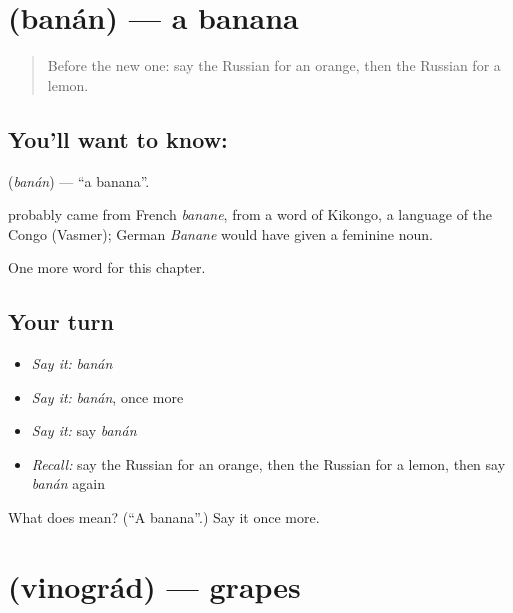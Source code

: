 \section[\texorpdfstring{\ru{банан} (banán)}{банан (banán)}]{ (banán) — a banana}

\label{lesson:RU-C223-banan}



\begin{quote}
Before the new one: say the Russian for an orange, then the Russian for a lemon.
\end{quote}

\subsection*{You'll want to know: }
\textbf{} (\emph{banán}) — \textquotedblleft{}a banana\textquotedblright{}.

\begin{cousinweb}
\textbf{} probably came from French \emph{banane}, from a word of Kikongo, a language of the Congo (Vasmer); German \emph{Banane} would have given a feminine noun.
\end{cousinweb}

\begin{grammarlens}[title={What you've built}]
One more word for this chapter.
\end{grammarlens}

\subsection*{Your turn}
\begin{itemize}
\raggedright
  \item \emph{Say it:} \emph{banán}
  \item \emph{Say it:} \emph{banán}, once more
  \item \emph{Say it:} say \emph{banán}
  \item \emph{Recall:} say the Russian for an orange, then the Russian for a lemon, then say \emph{banán} again
\end{itemize}

\begin{tcolorbox}[breakable,colback=teal!4,colframe=teal!35!black,title={Before you move on}]
What does  mean? (\textquotedblleft{}A banana\textquotedblright{}.) Say it once more.
\end{tcolorbox}
\section[\texorpdfstring{\ru{виноград} (vinográd)}{виноград (vinográd)}]{ (vinográd) — grapes}

